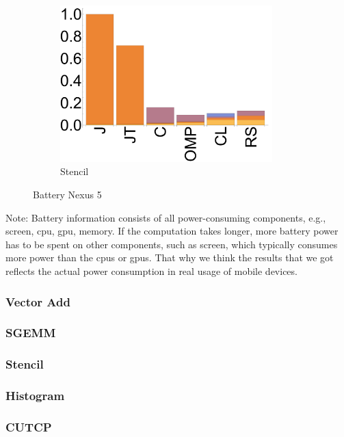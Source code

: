 \begin{figure}[ht]
  \begin{subfigure}[b]{0.3\textwidth}
      \includegraphics[width=0.9\textwidth]{data/bbattery_stencil_nexus7.pdf}
      \caption{Stencil} \label{fig:Stencil}
  \end{subfigure}

  \caption{Battery Nexus 5}
\end{figure}
Note: Battery information consists of all power-consuming components, e.g., screen,
cpu, gpu, memory. If the computation takes longer, more battery power has to
be spent on other components, such as screen, which typically consumes more
power than the cpus or gpus. That why we think the results that we got
reflects the actual power consumption in real usage of mobile devices.

\subsubsection{Vector Add}

\subsubsection{SGEMM}

\subsubsection{Stencil}

\subsubsection{Histogram}

\subsubsection{CUTCP}

